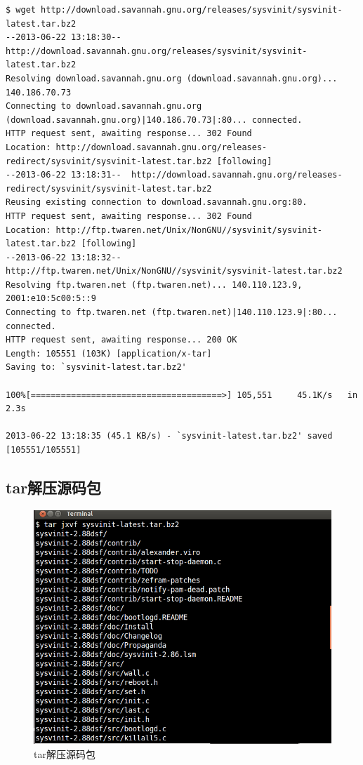 {\begin{shaded}\begin{verbatim}
$ wget http://download.savannah.gnu.org/releases/sysvinit/sysvinit-latest.tar.bz2
--2013-06-22 13:18:30--  http://download.savannah.gnu.org/releases/sysvinit/sysvinit-latest.tar.bz2
Resolving download.savannah.gnu.org (download.savannah.gnu.org)... 140.186.70.73
Connecting to download.savannah.gnu.org (download.savannah.gnu.org)|140.186.70.73|:80... connected.
HTTP request sent, awaiting response... 302 Found
Location: http://download.savannah.gnu.org/releases-redirect/sysvinit/sysvinit-latest.tar.bz2 [following]
--2013-06-22 13:18:31--  http://download.savannah.gnu.org/releases-redirect/sysvinit/sysvinit-latest.tar.bz2
Reusing existing connection to download.savannah.gnu.org:80.
HTTP request sent, awaiting response... 302 Found
Location: http://ftp.twaren.net/Unix/NonGNU//sysvinit/sysvinit-latest.tar.bz2 [following]
--2013-06-22 13:18:32--  http://ftp.twaren.net/Unix/NonGNU//sysvinit/sysvinit-latest.tar.bz2
Resolving ftp.twaren.net (ftp.twaren.net)... 140.110.123.9, 2001:e10:5c00:5::9
Connecting to ftp.twaren.net (ftp.twaren.net)|140.110.123.9|:80... connected.
HTTP request sent, awaiting response... 200 OK
Length: 105551 (103K) [application/x-tar]
Saving to: `sysvinit-latest.tar.bz2'

100%[======================================>] 105,551     45.1K/s   in 2.3s    

2013-06-22 13:18:35 (45.1 KB/s) - `sysvinit-latest.tar.bz2' saved [105551/105551]
\end{verbatim}\end{shaded}}
\subsection{tar解压源码包}

\begin{figure}[htbp]
\centering
\includegraphics{./pictures/1-2-tar.png}
\caption{tar解压源码包}
\end{figure}

